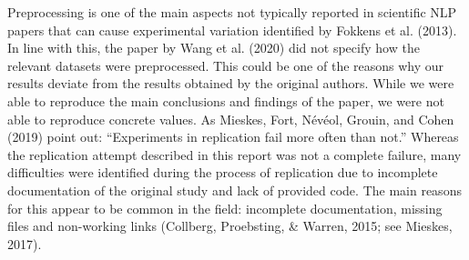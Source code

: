 \documentclass[
  english,
  man,floatsintext]{apa6}
\begin{document}
Preprocessing is one of the main aspects not typically reported in scientific NLP papers that can cause experimental variation identified by Fokkens et al. (2013). In line with this, the paper by Wang et al. (2020) did not specify how the relevant datasets were preprocessed. This could be one of the reasons why our results deviate from the results obtained by the original authors. While we were able to reproduce the main conclusions and findings of the paper, we were not able to reproduce concrete values. As Mieskes, Fort, Névéol, Grouin, and Cohen (2019) point out: ``Experiments in replication fail more often than not.'' Whereas the replication attempt described in this report was not a complete failure, many difficulties were identified during the process of replication due to incomplete documentation of the original study and lack of provided code. The main reasons for this appear to be common in the field: incomplete documentation, missing files and non-working links (Collberg, Proebsting, \& Warren, 2015; see Mieskes, 2017).
\end{document}
